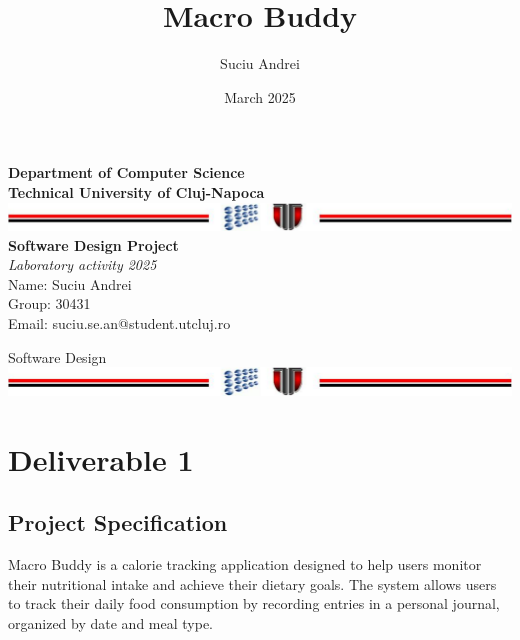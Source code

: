\documentclass[a4paper,10pt]{article}
\title{Macro Buddy}
\author{Suciu Andrei}
\date{March 2025}
\begin{document}
    \setlength{\parindent}{0pt}
    \begin{titlepage}
        \begin{center}
            \textbf{\large Department of Computer Science} \\[0.2cm]
            \textbf{\large Technical University of Cluj-Napoca} \\[0.5cm]
            \includegraphics[width=1\textwidth]{utLogo.png} \\[1.0cm]

            \textbf{Software Design Project} \\
            \textit{Laboratory activity 2025} \\[4.0cm]

            Name: Suciu Andrei \\
            Group: 30431 \\
            Email: suciu.se.an@student.utcluj.ro\\

            \vfill

            Software Design \\[0.5cm]
            \includegraphics[width=1\textwidth]{utLogo.png} \\[4.0cm]


        \end{center}
    \end{titlepage}
    \newpage

    \tableofcontents
    \newpage


\section{Deliverable 1}
    \subsection{Project Specification}
    Macro Buddy is a calorie tracking application designed to help users monitor their nutritional intake and achieve their dietary goals. The system allows users to track their daily food consumption by recording entries in a personal journal, organized by date and meal type. \\
\end{document}
